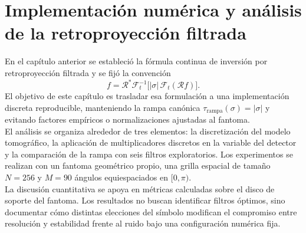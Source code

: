 \chapter{Implementación numérica y análisis de la retroproyección filtrada}

En el capítulo anterior se estableció la fórmula continua de inversión por retroproyección filtrada y se fijó la convención
\[
f=\mathcal R^*\mathcal F_t^{-1}\bigl[|\sigma|\,\mathcal F_t(\mathcal Rf)\bigr].
\]
El objetivo de este capítulo es trasladar esa formulación a una implementación discreta reproducible, manteniendo la rampa canónica $\tau_{\mathrm{rampa}}(\sigma)=|\sigma|$ y evitando factores empíricos o normalizaciones ajustadas al fantoma.\\

El análisis se organiza alrededor de tres elementos: la discretización del modelo tomográfico, la aplicación de multiplicadores discretos en la variable del detector y la comparación de la rampa con seis filtros exploratorios. Los experimentos se realizan con un fantoma geométrico propio, una grilla espacial de tamaño $N=256$ y $M=90$ ángulos equiespaciados en $[0,\pi)$.\\

La discusión cuantitativa se apoya en métricas calculadas sobre el disco de soporte del fantoma. Los resultados no buscan identificar filtros óptimos, sino documentar cómo distintas elecciones del símbolo modifican el compromiso entre resolución y estabilidad frente al ruido bajo una configuración numérica fija.






